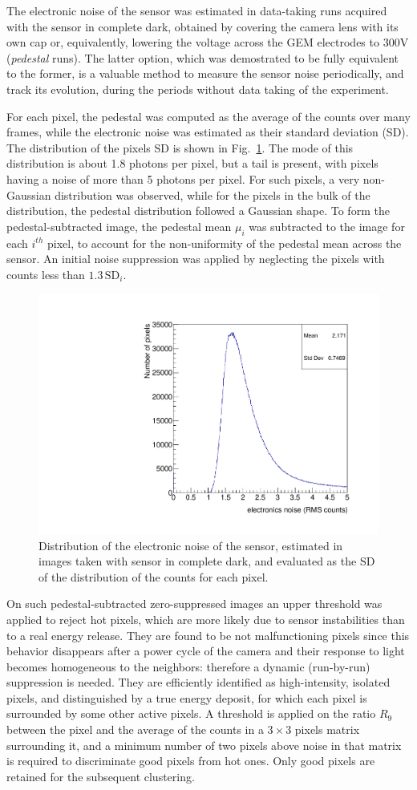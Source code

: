 The electronic noise of the sensor was estimated in data-taking runs
acquired with the sensor in complete dark, obtained by covering the
camera lens with its own cap or, equivalently, lowering the voltage
across the GEM electrodes to 300\unit{V} ({\it pedestal} runs). The
latter option, which was demostrated to be fully equivalent to the
former, is a valuable method to measure the sensor noise periodically,
and track its evolution, during the periods without data taking of
the \cygno experiment.

For each pixel, the pedestal was computed as the average of the counts
over many frames, while the electronic noise was estimated as their
standard deviation (SD). The distribution of the pixels SD is shown in
Fig.~\ref{fig:noise}. The mode of this distribution is about 1.8
photons per pixel, but a tail is present, with pixels having a noise
of more than 5 photons per pixel. For such pixels, a very non-Gaussian
distribution was observed, while for the pixels in the bulk of the
distribution, the pedestal distribution followed a Gaussian shape. To
form the pedestal-subtracted image, the pedestal mean $\mu_i$ was
subtracted to the image for each $i^{th}$ pixel, to account for the
non-uniformity of the pedestal mean across the sensor. An initial
noise suppression was applied by neglecting the pixels with counts
less than $1.3\,\textrm{SD}_i$.
%
\begin{figure}[ht]
  \centering
  \includegraphics[width=0.45\linewidth]{figures/sensor_noise}
  \caption{Distribution of the electronic noise of the sensor,
    estimated in images taken with sensor in complete dark, and
    evaluated as the SD of the distribution of the counts for each
    pixel.  \label{fig:noise}}
\end{figure}
%
On such pedestal-subtracted zero-suppressed images an upper threshold
was applied to reject hot pixels, which are more likely due to sensor
instabilities than to a real energy release. They are found to be not
malfunctioning pixels since this behavior disappears after a power
cycle of the camera and their response to light becomes homogeneous to
the neighbors: therefore a dynamic (run-by-run) suppression is needed.
They are efficiently identified as high-intensity, isolated pixels,
and distinguished by a true energy deposit, for which each pixel is
surrounded by some other active pixels. A threshold is applied on the
ratio $R_9$ between the pixel and the average of the counts in a
$3{\times}3$ pixels matrix surrounding it, and a minimum number of two
pixels above noise in that matrix is required to discriminate good
pixels from hot ones. Only good pixels are retained for the subsequent
clustering.


